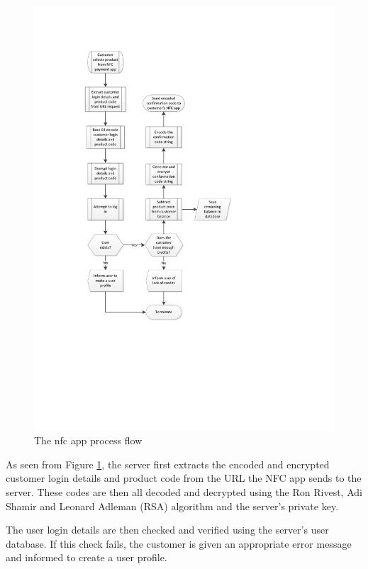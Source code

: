\begin{figure}[h]
 \centering 
 \includegraphics[clip=true, trim = 0 200 100 80,
 scale=0.7]{nfc_processflow_bak}
 \caption{The nfc app process flow}
 \label{fig:nfc-process}
\end{figure}

As seen from Figure \ref{fig:nfc-process}, the server first extracts the encoded and encrypted
customer login details and product code from the URL the NFC app sends to the server. These
codes are then all decoded and decrypted using the Ron Rivest, Adi Shamir and Leonard Adleman
(RSA) algorithm and the server's private key. 

The user login details are then checked and verified using the server's user database. If this
check fails, the customer is given an appropriate error message and informed to create a user
profile. 

